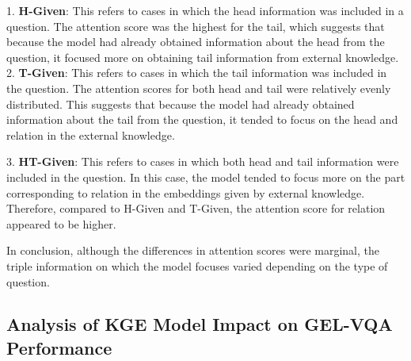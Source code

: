 \documentclass[letterpaper]{article} %
\begin{document}
\begin{itemize}
1. \textbf{H-Given}: This refers to cases in which the head information was included in a question. The attention score was the highest for the tail, which suggests that because the model had already obtained information about the head from the question, it focused more on obtaining tail information from external knowledge.
2. \textbf{T-Given}: This refers to cases in which the tail information was included in the question. The attention scores for both head and tail were relatively evenly distributed. This suggests that because the model had already obtained information about the tail from the question, it tended to focus on the head and relation in the external knowledge.

3. \textbf{HT-Given}: This refers to cases in which both head and tail information were included in the question. In this case, the model tended to focus more on the part corresponding to relation in the embeddings given by external knowledge. Therefore, compared to H-Given and T-Given, the attention score for relation appeared to be higher.
\end{itemize}

In conclusion, although the differences in attention scores were marginal, the triple information on which the model focuses varied depending on the type of question.

\vspace{-0.80mm}
\subsection{Analysis of KGE Model Impact on GEL-VQA Performance}
\end{document}
